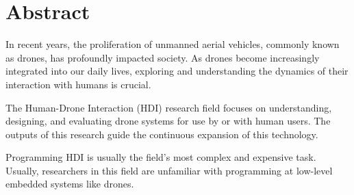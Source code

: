 \documentclass{Configuration_Files/PoliMi3i_thesis}
\begin{document}


\pagestyle{empty} %
\frontmatter %


\startpreamble
\setcounter{page}{1} %

\chapter*{Abstract} 
In recent years, the proliferation of unmanned aerial vehicles, commonly known as drones, has profoundly impacted society.
As drones become increasingly integrated into our daily lives, exploring and understanding the dynamics of their interaction with humans is crucial.

The Human-Drone Interaction (HDI) research field focuses on understanding, designing, and evaluating drone systems for use by or with human users. 
The outputs of this research guide the continuous expansion of this technology.

Programming HDI is usually the field's most complex and expensive task. 
Usually, researchers in this field are unfamiliar with programming at low-level embedded systems like drones.
\end{document}
